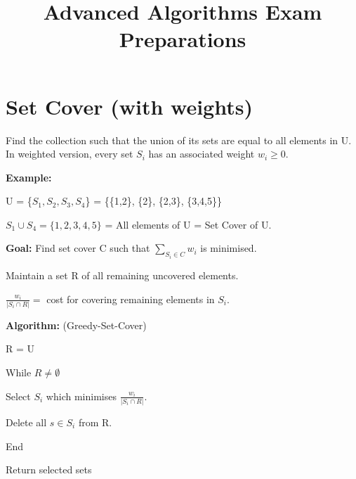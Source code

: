 \documentclass{proc}
\title{\sf Advanced Algorithms Exam Preparations}
\begin{document}
\maketitle

\tableofcontents

\section{Set Cover (with weights)}

Find the collection such that the union of its sets are equal to all elements in U. In weighted version, every set $S_{i}$ has an associated weight $w_{i} \ge 0$.

\begin{mdframed}
    \textbf{Example:}
    
    U = \{$S_{1}, S_{2}, S_{3}, S_{4}$\} = \{\{1,2\}, \{2\}, \{2,3\}, \{3,4,5\}\}
    
    $S_{1} \cup S_{4} = \{1,2,3,4,5\}$ = All elements of U = Set Cover of U.
\end{mdframed}

\textbf{Goal:} Find set cover C such that $\sum_{S_{i} \in C} w_{i}$ is minimised.

Maintain a set R of all remaining uncovered elements.
\begin{mdframed}
    $\frac{w_{i}}{|S_{i} \cap R|} = $ cost for covering remaining elements in $S_{i}$.
\end{mdframed}

\begin{mdframed}
    \textbf{Algorithm:} (Greedy-Set-Cover)
    
    R = U
    
    While $R \neq \emptyset$
    
        \hspace{2ex} Select $S_{i}$ which minimises $\frac{w_{i}}{|S_{i} \cap R|}$.
        
        \hspace{2ex} Delete all $s \in S_{i}$ from R.
        
    End
    
    Return selected sets
\end{mdframed}
\end{document}
